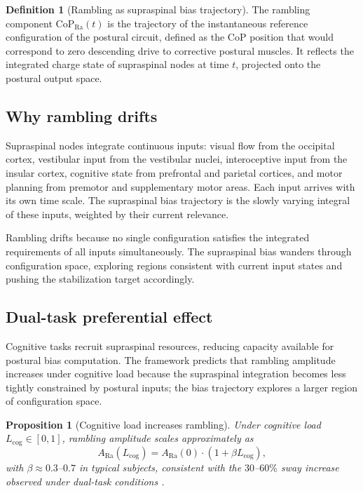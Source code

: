 \documentclass[11pt,twocolumn,a4paper]{article}
\newtheorem{proposition}[theorem]{Proposition}
\theoremstyle{definition}
\newtheorem{definition}[theorem]{Definition}
\theoremstyle{remark}
\newcommand{\Ra}{\mathrm{Ra}}
\begin{document}
\begin{definition}[Rambling as supraspinal bias trajectory]
\label{def:rambling}
The rambling component $\mathrm{CoP}_{\Ra}(t)$ is the trajectory of
the instantaneous reference configuration of the postural circuit,
defined as the CoP position that would correspond to zero
descending drive to corrective postural muscles. It reflects the
integrated charge state of supraspinal nodes at time $t$, projected
onto the postural output space.
\end{definition}

\subsection{Why rambling drifts}

Supraspinal nodes integrate continuous inputs: visual flow from
the occipital cortex, vestibular input from the vestibular nuclei,
interoceptive input from the insular cortex, cognitive state from
prefrontal and parietal cortices, and motor planning from premotor
and supplementary motor areas. Each input arrives with its own
time scale. The supraspinal bias trajectory is the slowly varying
integral of these inputs, weighted by their current relevance.

Rambling drifts because no single configuration satisfies the
integrated requirements of all inputs simultaneously. The
supraspinal bias wanders through configuration space, exploring
regions consistent with current input states and pushing the
stabilization target accordingly.

\subsection{Dual-task preferential effect}

Cognitive tasks recruit supraspinal resources, reducing capacity
available for postural bias computation. The framework predicts
that rambling amplitude increases under cognitive load because
the supraspinal integration becomes less tightly constrained by
postural inputs; the bias trajectory explores a larger region of
configuration space.

\begin{proposition}[Cognitive load increases rambling]
Under cognitive load $L_{\mathrm{cog}} \in [0, 1]$, rambling
amplitude scales approximately as
\begin{equation}
A_{\Ra}(L_{\mathrm{cog}}) = A_{\Ra}(0) \cdot (1 + \beta L_{\mathrm{cog}}),
\end{equation}
with $\beta \approx 0.3$--$0.7$ in typical subjects, consistent
with the $30$--$60\%$ sway increase observed under dual-task
conditions \citep{lajoie1993,pellecchia2003}.
\end{proposition}
\end{document}
